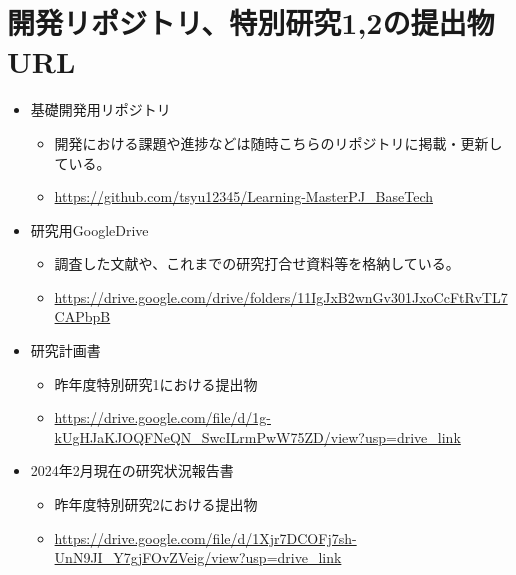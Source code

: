 \documentclass{article}[jsarticle]
\begin{document}
\section{開発リポジトリ、特別研究1,2の提出物URL}
\begin{itemize}
    \item 基礎開発用リポジトリ
    \begin{itemize}
        \item 開発における課題や進捗などは随時こちらのリポジトリに掲載・更新している。
        \item \url{https://github.com/tsyu12345/Learning-MasterPJ_BaseTech}
    \end{itemize}
    \item 研究用GoogleDrive
    \begin{itemize}
        \item 調査した文献や、これまでの研究打合せ資料等を格納している。
        \item \url{https://drive.google.com/drive/folders/11IgJxB2wnGv301JxoCcFtRvTL7CAPbpB}
    \end{itemize}
    \item 研究計画書
    \begin{itemize}
        \item 昨年度特別研究1における提出物
        \item \url{https://drive.google.com/file/d/1g-kUgHJaKJOQFNeQN_SwcILrmPwW75ZD/view?usp=drive_link}
    \end{itemize}
    \item 2024年2月現在の研究状況報告書
    \begin{itemize}
        \item 昨年度特別研究2における提出物
        \item \url{https://drive.google.com/file/d/1Xjr7DCOFj7sh-UnN9JI_Y7gjFOvZVeig/view?usp=drive_link}
    \end{itemize}
\end{itemize}
\end{document}
